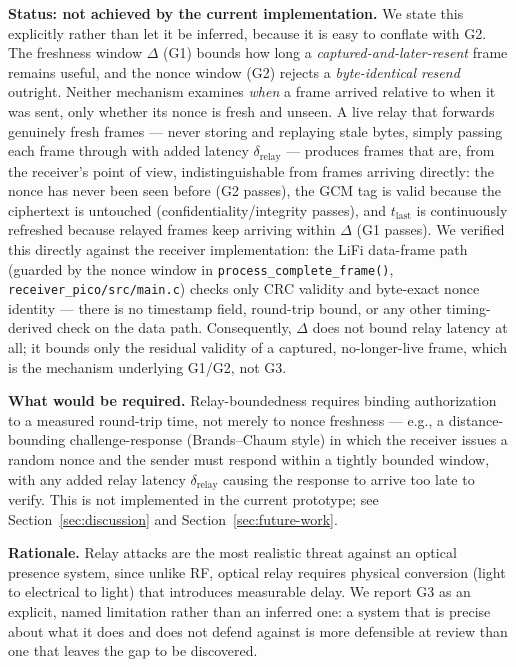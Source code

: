 \documentclass[conference]{IEEEtran}
\begin{document}
\textbf{Status: not achieved by the current implementation.} We state this explicitly rather than let it be inferred, because it is easy to conflate with G2. The freshness window $\Delta$ (G1) bounds how long a \emph{captured-and-later-resent} frame remains useful, and the nonce window (G2) rejects a \emph{byte-identical resend} outright. Neither mechanism examines \emph{when} a frame arrived relative to when it was sent, only whether its nonce is fresh and unseen. A live relay that forwards genuinely fresh frames — never storing and replaying stale bytes, simply passing each frame through with added latency $\delta_{\text{relay}}$ — produces frames that are, from the receiver's point of view, indistinguishable from frames arriving directly: the nonce has never been seen before (G2 passes), the GCM tag is valid because the ciphertext is untouched (confidentiality/integrity passes), and $t_{\text{last}}$ is continuously refreshed because relayed frames keep arriving within $\Delta$ (G1 passes). We verified this directly against the receiver implementation: the LiFi data-frame path (guarded by the nonce window in \texttt{process\_complete\_frame()}, \texttt{receiver\_pico/src/main.c}) checks only CRC validity and byte-exact nonce identity — there is no timestamp field, round-trip bound, or any other timing-derived check on the data path. Consequently, $\Delta$ does not bound relay latency at all; it bounds only the residual validity of a captured, no-longer-live frame, which is the mechanism underlying G1/G2, not G3.

\textbf{What would be required.} Relay-boundedness requires binding authorization to a measured round-trip time, not merely to nonce freshness — e.g., a distance-bounding challenge-response (Brands--Chaum style) in which the receiver issues a random nonce and the sender must respond within a tightly bounded window, with any added relay latency $\delta_{\text{relay}}$ causing the response to arrive too late to verify. This is not implemented in the current prototype; see Section~\ref{sec:discussion} and Section~\ref{sec:future-work}.

\textbf{Rationale.} Relay attacks are the most realistic threat against an optical presence system, since unlike RF, optical relay requires physical conversion (light to electrical to light) that introduces measurable delay. We report G3 as an explicit, named limitation rather than an inferred one: a system that is precise about what it does and does not defend against is more defensible at review than one that leaves the gap to be discovered.
\end{document}
